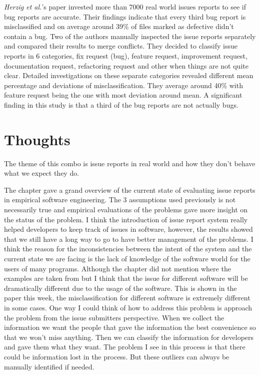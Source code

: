 \documentclass[sigconf]{acmart}
\begin{document}
{\it Herzig et al.}'s paper invested more than 7000 real world issues reports to see if bug reports are accurate. Their findings indicate that every third bug report is misclassified and on average around 39\% of files marked as defective didn't contain a bug. Two of the authors manually inspected the issue reports separately and compared their results to merge conflicts. They decided to classify issue reports in 6 categories, fix request (bug), feature request, improvement request, documentation request, refactoring request and other when things are not quite clear. Detailed investigations on these separate categories revealed different mean percentage and deviations of misclassification. They average around 40\% with feature request being the one with most deviation around mean. A significant finding in this study is that a third of the bug reports are not actually bugs. 


\section{Thoughts}
The theme of this combo is issue reports in real world and how they don't behave what we expect they do.

The chapter gave a grand overview of the current state of evaluating issue reports in empirical software engineering. The 3 assumptions used previously is not necessarily true and empirical evaluations of the problems gave more insight on the status of the problem. I think the introduction of issue report system really helped developers to keep track of issues in software, however, the results showed that we still have a long way to go to have better management of the problems. I think the reason for the inconsistencies between the intent of the system and the current state we are facing is the lack of knowledge of the software world for the users of many programs. Although the chapter did not mention where the examples are taken from but I think that the issue for different software will be dramatically different due to the usage of the software. This is shown in the paper this week, the misclassification for different software is extremely different in some cases. One way I could think of how to address this problem is approach the problem from the issue submitters perspective. When we collect the information we want the people that gave the information the best convenience so that we won't miss anything. Then we can classify the information for developers and gave them what they want. The problem I see in this process is that there could be information lost in the process. But these outliers can always be manually identified if needed. 
\end{document}
